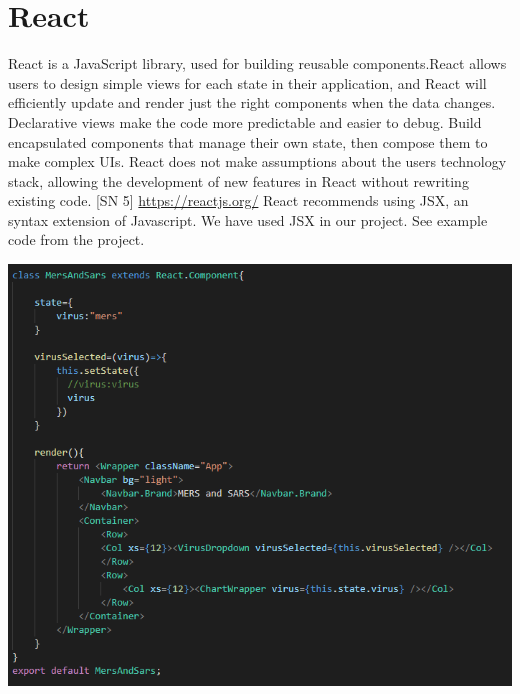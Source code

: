 \section{React}
React is a JavaScript library, used for building reusable components.React allows users to design simple views for each state in their application, and React will efficiently update and render just the right components when the data changes.
Declarative views make the code more predictable and easier to debug. Build encapsulated components that manage their own state, then compose them to make complex UIs.
React does not make assumptions about the users technology stack, allowing the development of new features in React without rewriting existing code. [SN 5] \url{https://reactjs.org/}
React recommends using JSX, an syntax extension of Javascript. We have used JSX in our project.
See example code from the project.
\begin{center}    
      \includegraphics[scale=0.6]{img/jsx.PNG}
\end{center}

